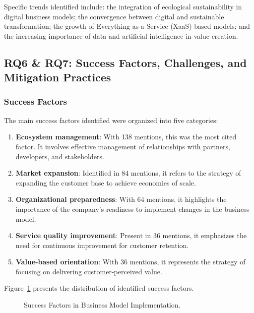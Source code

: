 \documentclass[journal]{IEEEtran}
\begin{document}
Specific trends identified include: the integration of ecological sustainability in digital business models; the convergence between digital and sustainable transformation; the growth of Everything as a Service (XaaS) based models; and the increasing importance of data and artificial intelligence in value creation.

\subsection{RQ6 \& RQ7: Success Factors, Challenges, and Mitigation Practices}

\subsubsection{Success Factors}

The main success factors identified were organized into five categories:

\begin{enumerate}
    \item \textbf{Ecosystem management}: With 138 mentions, this was the most cited factor. It involves effective management of relationships with partners, developers, and stakeholders.

    \item \textbf{Market expansion}: Identified in 84 mentions, it refers to the strategy of expanding the customer base to achieve economies of scale.

    \item \textbf{Organizational preparedness}: With 64 mentions, it highlights the importance of the company's readiness to implement changes in the business model.

    \item \textbf{Service quality improvement}: Present in 36 mentions, it emphasizes the need for continuous improvement for customer retention.

    \item \textbf{Value-based orientation}: With 36 mentions, it represents the strategy of focusing on delivering customer-perceived value.
\end{enumerate}

Figure~\ref{fig:success-factors} presents the distribution of identified success factors.

\begin{figure}[!htb]
    \centering
    
    \caption{Success Factors in Business Model Implementation.}
    \label{fig:success-factors}
\end{figure}
\end{document}

